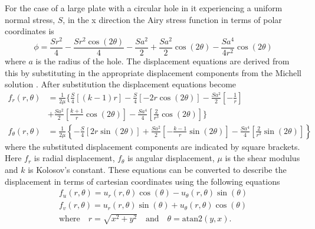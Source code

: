 \documentclass[12pt,oneside,openany,a4paper, %
english, %
masters-t, goldenblock]{usthesis}
\begin{document}
\begin{appendices}
For the case of a large plate with a circular hole in it experiencing a uniform normal stress, $S$, in the x direction the Airy stress function in terms of polar coordinates is
\begin{equation}
  \phi = \frac{Sr^2}{4} - \frac{Sr^2 \cos(2 \theta)}{4} -\frac{Sa^2}{2} + \frac{Sa^2}{2} \cos(2 \theta) - \frac{Sa^4}{4r^2} \cos(2 \theta)
\end{equation}
where $a$ is the radius of the hole. The displacement equations are derived from this by substituting in the appropriate displacement components from the Michell solution \cite{michell1899direct}. After substitution the displacement equations become
\begin{align}
  f_r(r,\theta) &= \frac{1}{2 \mu} \biggl \{ \frac{S}{4} \left[ (k-1)r \right]-\frac{S}{4} \left[ -2r\cos(2\theta) \right] -\frac{Sa^2}{2} \left[ -\frac{1}{r} \right]  \\ 
  &+\frac{Sa^2}{2}\left[ \frac{k+1}{r} \cos(2 \theta)\right] - \frac{Sa^4}{4}\left[ \frac{2}{r^3} \cos(2 \theta) \right] \biggr\} \nonumber \\
  f_{\theta}(r,\theta) &= \frac{1}{2 \mu} \left\{ -\frac{S}{4} \left[ 2r \sin(2 \theta) \right] + \frac{Sa^2}{2}\left[ -\frac{k-1}{r} \sin(2 \theta) \right]- \frac{Sa^4}{4} \left[ \frac{2}{r^3} \sin(2 \theta) \right] \right\}
\end{align}
where the substituted displacement components are indicated by square brackets. Here $f_r$ is radial displacement, $f_{\theta}$ is angular displacement, $\mu$ is the shear modulus and $k$ is Kolosov's constant. These equations can be converted to describe the displacement in terms of cartesian coordinates using the following equations
\begin{align}
  f_u(r,\theta) = u_r(r,\theta) \cos(\theta) - u_{\theta}(r,\theta) \sin(\theta) \\
  f_v(r,\theta) = u_r(r,\theta) \sin(\theta) + u_{\theta}(r,\theta) \cos(\theta) \\
  \text{where} \quad r=\sqrt{x^2+y^2} \quad \text{and} \quad \theta = \text{atan2} (y,x). \label{eq: pol2cart}
\end{align}




\end{appendices}
\end{document}

